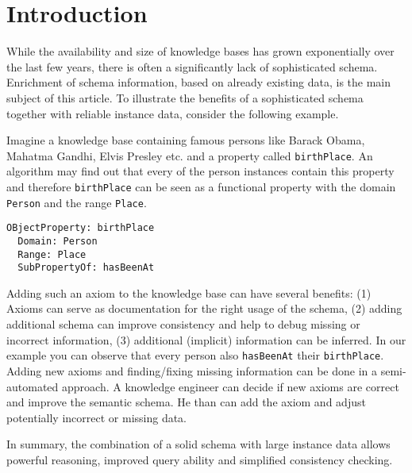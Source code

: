 \section{Introduction}
While the availability and size of knowledge bases has grown exponentially over
the last few years, there is often a significantly lack of sophisticated
schema.
Enrichment of schema information, based on already existing data, is the main
subject of this article.
To illustrate the benefits of a sophisticated schema together with reliable
instance data, consider the following example.

\begin{example}
Imagine a knowledge base containing famous persons like Barack Obama, Mahatma
Gandhi, Elvis Presley etc. and a property called \texttt{birthPlace}. An
algorithm may find out that every of the person instances contain this property
and therefore \texttt{birthPlace} can be seen as a functional property with the
domain \texttt{Person} and the range \texttt{Place}.\\
\vspace{-0.90 cm}
\begin{verbatim}
OBjectProperty: birthPlace
  Domain: Person
  Range: Place
  SubPropertyOf: hasBeenAt
\end{verbatim}
\end{example}
\vspace{-0.4 cm}

Adding such an axiom to the knowledge base can have several benefits:
(1) Axioms can serve as documentation for the right usage of the
schema, (2) adding additional schema can improve consistency and help to debug missing or incorrect
information, (3) additional (implicit) information can be inferred. In our
example you can observe that every person also \texttt{hasBeenAt} their
\texttt{birthPlace}.
Adding new axioms and finding/fixing missing information can be done in a
semi-automated approach. A knowledge engineer can decide if new axioms are
correct and improve the semantic schema. He than can add the axiom and adjust
potentially incorrect or missing data. \cite{paper2}

In summary, the combination of a solid schema with large instance data allows
powerful reasoning, improved query ability and simplified consistency checking. 